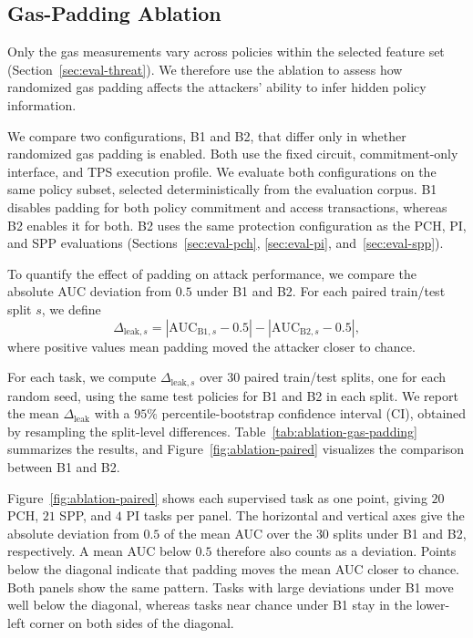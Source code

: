 \subsection{Gas-Padding Ablation}
\label{sec:eval-ablation}

Only the gas measurements vary across policies within the selected feature set (Section~\ref{sec:eval-threat}).
We therefore use the ablation to assess how randomized gas padding affects the attackers' ability to infer hidden policy information.

We compare two configurations, B1 and B2, that differ only in whether randomized gas padding is enabled.
Both use the fixed circuit, commitment-only interface, and TPS execution profile.
We evaluate both configurations on the same policy subset, selected deterministically from the evaluation corpus.
B1 disables padding for both policy commitment and access transactions, whereas B2 enables it for both.
B2 uses the same protection configuration as the PCH, PI, and SPP evaluations (Sections~\ref{sec:eval-pch}, \ref{sec:eval-pi}, and~\ref{sec:eval-spp}).

To quantify the effect of padding on attack performance, we compare the absolute AUC deviation from $0.5$ under B1 and B2.
For each paired train/test split $s$, we define
%
\begin{equation}
	\Delta_{\text{leak},s} =
	|\mathrm{AUC}_{\mathrm{B1},s} - 0.5| -
	|\mathrm{AUC}_{\mathrm{B2},s} - 0.5|,
	\label{eq:delta-leak}
\end{equation}
%
where positive values mean padding moved the attacker closer to chance.

For each task, we compute $\Delta_{\text{leak},s}$ over $30$ paired train/test splits, one for each random seed, using the same test policies for B1 and B2 in each split.
We report the mean $\Delta_{\text{leak}}$ with a $95\%$ percentile-bootstrap confidence interval (CI), obtained by resampling the split-level differences.
Table~\ref{tab:ablation-gas-padding} summarizes the results, and Figure~\ref{fig:ablation-paired} visualizes the comparison between B1 and B2.



Figure~\ref{fig:ablation-paired} shows each supervised task as one point, giving $20$ PCH, $21$ SPP, and $4$ PI tasks per panel.
The horizontal and vertical axes give the absolute deviation from $0.5$ of the mean AUC over the $30$ splits under B1 and B2, respectively.
A mean AUC below $0.5$ therefore also counts as a deviation.
Points below the diagonal indicate that padding moves the mean AUC closer to chance.
Both panels show the same pattern. Tasks with large deviations under B1 move well below the diagonal, whereas tasks near chance under B1 stay in the lower-left corner on both sides of the diagonal.

